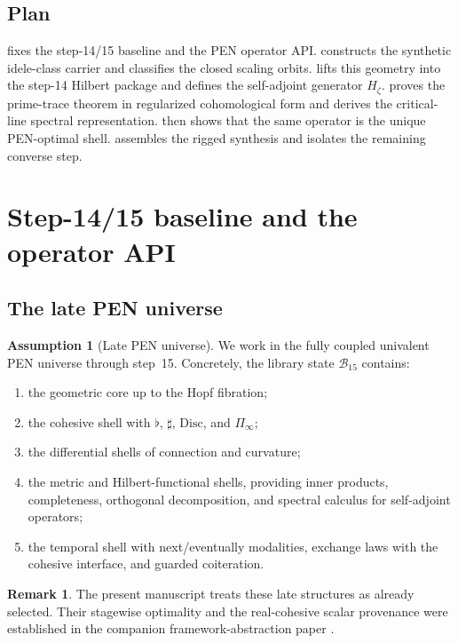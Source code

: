\documentclass[11pt,a4paper]{article}
\theoremstyle{plain}
\theoremstyle{definition}
\newtheorem{assumption}[theorem]{Assumption}
\newtheorem{remark}[theorem]{Remark}
\newcommand{\Bcal}{\mathcal{B}}
\newcommand{\Shape}{\Pi_{\!\infty}}
\newcommand{\Disc}{\mathrm{Disc}}
\newcommand{\flatop}{\flat}
\newcommand{\sharpop}{\sharp}
\begin{document}
\subsection{Plan}

 fixes the step-14/15 baseline and the PEN operator API.  constructs the synthetic idele-class carrier and classifies the closed scaling orbits.  lifts this geometry into the step-14 Hilbert package and defines the self-adjoint generator $H_{\zeta}$.  proves the prime-trace theorem in regularized cohomological form and derives the critical-line spectral representation.  then shows that the same operator is the unique PEN-optimal shell.  assembles the rigged synthesis and isolates the remaining converse step.

\section{Step-14/15 baseline and the operator API}
\label{sec:background}

\subsection{The late PEN universe}

\begin{assumption}[Late PEN universe]
\label{ass:late-pen}
We work in the fully coupled univalent PEN universe through step~15. Concretely, the library state $\Bcal_{15}$ contains:
\begin{enumerate}
  \item the geometric core up to the Hopf fibration;
  \item the cohesive shell with $\flatop$, $\sharpop$, $\Disc$, and $\Shape$;
  \item the differential shells of connection and curvature;
  \item the metric and Hilbert-functional shells, providing inner products, completeness, orthogonal decomposition, and spectral calculus for self-adjoint operators;
  \item the temporal shell with next/eventually modalities, exchange laws with the cohesive interface, and guarded coiteration.
\end{enumerate}
\end{assumption}

\begin{remark}
The present manuscript treats these late structures as already selected. Their stagewise optimality and the real-cohesive scalar provenance were established in the companion framework-abstraction paper \citep{lande-framework}.
\end{remark}
\end{document}
